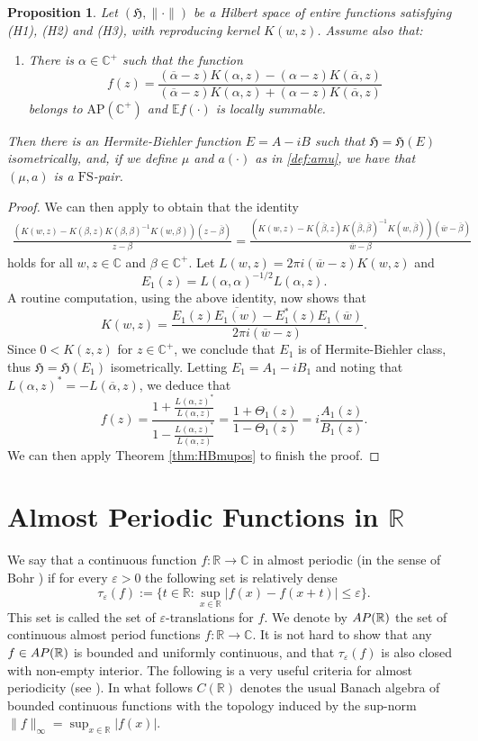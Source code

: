 \documentclass[a4paper,reqno,12pt]{amsart}
\newtheorem{proposition}[theorem]{Proposition}\newtheorem{corollary}[theorem]{Corollary}
\newcommand{\E}{\mathcal{E}}
\renewcommand{\H}{\mathbb{C}^+}
\renewcommand{\r}{\mathbb{R}}
\newcommand{\cp}{\mathbb{C}} %
\newcommand{\al}{\alpha}
\newcommand{\be}{\beta}
\newcommand{\ep}{\varepsilon}
\newcommand{\w}{\ov{w}}
\newcommand{\1}{{\bf 1}}
\newcommand{\apc}{\mathrm{AP}(\H)}
\newcommand{\fs}{\mathrm{FS}}
\renewcommand{\E}{\mathbb{E}}
\newcommand{\ov}[1]{\overline{#1}}
\newcommand{\apr}{{\rm AP}(\r)}
\renewcommand{\1}{{\bo 1}}
\renewcommand{\a}{a(\cdot)}
\newcommand{\h}{\mathfrak{H}}
\begin{document}
\begin{proposition}
Let $(\h,\|\cdot\|)$ be a Hilbert space of entire functions satisfying (H1), (H2) and (H3), with reproducing kernel $K(w,z)$. Assume also that:
\begin{enumerate}
\item[(H4)] There is $\al \in \H$ such that the function
$$
f(z)=\frac{{(\ov{\al}-z)K(\al,z)}-(\al-z)K(\ov{\al},z)}{{(\ov{\al}-z)K(\al,z)}+(\al-z)K(\ov{\al},z)}
$$
belongs to $\apc$ and $\E f(\cdot)$ is locally summable.
\end{enumerate}
Then there is  an Hermite-Biehler function $E=A-iB$ such that $\h=\h(E)$ isometrically, and, if we define $\mu$ and $\a$ as in \eqref{def:amu}, we have that $(\mu,a)$ is a $\fs$-pair.
\end{proposition}
\begin{proof}
We can then apply \cite[Thm. 23, p. 58]{dB} to obtain that the identity
\begin{align*}
\frac{(K(w,z)-K(\be,z)K(\be,\be)^{-1}K(w,\be))(z-\ov{\be})}{z-\be} = \frac{(K(w,z)-K(\ov{\be},z)K(\ov{\be},\ov{\be})^{-1}K(w,\ov{\be}))(\w-\ov{\be})}{\w-\be}
\end{align*}
holds for all $w,z\in \cp$ and $\be\in \H$. Let $L(w,z)=2\pi i (\w-z)K(w,z)$ and
$$
E_1(z)=L(\al,\al)^{-1/2}L(\al,z).
$$
A routine computation, using the above identity, now shows that 
$$
K(w,z) = \frac{E_1(z)\ov{E_1(w)}-E_1^*(z)E_1(\w)}{2\pi i(\w-z)}.
$$
Since $0<K(z,z)$ for $z\in \H$, we conclude that $E_1$
is of Hermite-Biehler class, thus $\h=\h(E_1)$ isometrically. Letting $E_1=A_1-iB_1$ and noting that $L(\al,z)^*=-L(\ov{\al},z)$,  we deduce that
$$
f(z)=\frac{1+\frac{L(\al,z)^*}{L(\al,z)}}{1-\frac{L(\al,z)^*}{L(\al,z)}}=\frac{1+\Theta_1(z)}{1-\Theta_1(z)}=i\frac{A_1(z)}{B_1(z)}.
$$
We can then apply Theorem \ref{thm:HBmupos} to finish the proof.
\end{proof}

\section{Almost Periodic Functions in $\r$}\label{sec:AP}
We say that a continuous function $f:\r\to\cp$ in almost periodic (in the sense of Bohr \cite{Bo}) if for every $\ep>0$ the following set is relatively dense
$$
\tau_\ep(f):=\{t\in \r : \sup_{x\in \r} |f(x)-f(x+t)|\leq \ep\}.
$$
This set is called the set of $\ep$-translations for $f$. 
We denote by $\apr$ the set of continuous almost period functions $f:\r\to\cp$. It is not hard to show that any $f\in \apr$ is bounded and uniformly continuous, and that $\tau_\ep(f)$ is also closed with non-empty interior. The following is a very useful criteria for almost periodicity (see \cite[p. 7]{AP}). In what follows $C(\r)$ denotes the usual Banach algebra of bounded continuous functions with the topology induced by the sup-norm $\|f\|_{\infty}=\sup_{x\in \r} |f(x)|$. 
\end{document}
